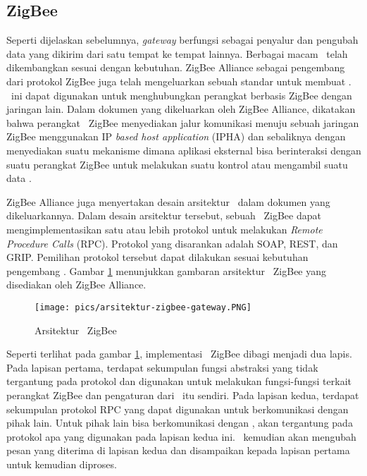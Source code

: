 \subsection{ZigBee \Gateway}

Seperti dijelaskan sebelumnya, \textit{gateway} berfungsi sebagai penyalur dan pengubah data yang dikirim dari satu tempat ke tempat lainnya. Berbagai macam \gateway~telah dikembangkan sesuai dengan kebutuhan. ZigBee Alliance sebagai pengembang dari protokol ZigBee juga telah mengeluarkan sebuah standar untuk membuat \gateway. \Gateway~ini dapat digunakan untuk menghubungkan perangkat berbasis ZigBee dengan jaringan lain. Dalam dokumen yang dikeluarkan oleh ZigBee Alliance, dikatakan bahwa perangkat \gateway~ZigBee menyediakan jalur komunikasi menuju sebuah jaringan ZigBee menggunakan IP \textit{based host application} (IPHA) dan sebaliknya dengan menyediakan suatu mekanisme dimana aplikasi eksternal bisa berinteraksi dengan suatu perangkat ZigBee untuk melakukan suatu kontrol atau mengambil suatu data \cite{zigbeegateway}.

ZigBee Alliance juga menyertakan desain arsitektur \gateway~dalam dokumen yang dikeluarkannya. Dalam desain arsitektur tersebut, sebuah \gateway~ZigBee dapat mengimplementasikan satu atau lebih protokol untuk melakukan \textit{Remote Procedure Calls} (RPC). Protokol yang disarankan adalah SOAP, REST, dan GRIP. Pemilihan protokol tersebut dapat dilakukan sesuai kebutuhan pengembang \cite{zigbeeGateway2}. Gambar \ref{fig:arsitektur-zigbee} menunjukkan gambaran arsitektur \gateway~ZigBee yang disediakan oleh ZigBee Alliance.

\begin{figure}
	\centering
	\texttt{[image: pics/arsitektur-zigbee-gateway.PNG]}
	\caption{Arsitektur \Gateway~ZigBee\cite{zigbeeGateway2}}
	\label{fig:arsitektur-zigbee}
\end{figure}

Seperti terlihat pada gambar \ref{fig:arsitektur-zigbee}, implementasi \gateway~ZigBee dibagi menjadi dua lapis. Pada lapisan pertama, terdapat sekumpulan fungsi abstraksi yang tidak tergantung pada protokol dan digunakan untuk melakukan fungsi-fungsi terkait perangkat ZigBee dan pengaturan dari \gateway~itu sendiri. Pada lapisan kedua, terdapat sekumpulan protokol RPC yang dapat digunakan untuk berkomunikasi dengan pihak lain. Untuk pihak lain bisa berkomunikasi dengan \gateway, akan tergantung pada protokol apa yang digunakan pada lapisan kedua ini. \Gateway~kemudian akan mengubah pesan yang diterima di lapisan kedua dan disampaikan kepada lapisan pertama untuk kemudian diproses.

